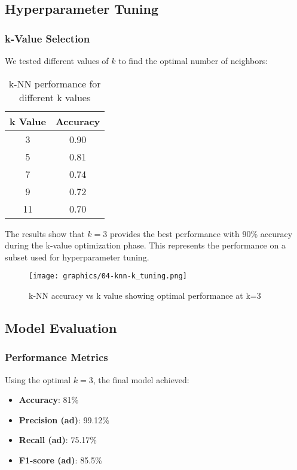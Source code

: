\subsection{Hyperparameter Tuning}
\subsubsection{k-Value Selection}
We tested different values of $k$ to find the optimal number of neighbors:

\begin{table}[H]
\centering
\caption{k-NN performance for different k values}
\label{tab:knn-k-values}
\begin{tabular}{cc}
\toprule
\textbf{k Value} & \textbf{Accuracy} \\
\midrule
3 & 0.90 \\
5 & 0.81 \\
7 & 0.74 \\
9 & 0.72 \\
11 & 0.70 \\
\bottomrule
\end{tabular}
\end{table}

The results show that $k = 3$ provides the best performance with 90\% accuracy during the k-value optimization phase. This represents the performance on a subset used for hyperparameter tuning.

\begin{figure}[H]
\centering
\texttt{[image: graphics/04-knn-k\_tuning.png]}
\caption{k-NN accuracy vs k value showing optimal performance at k=3}
\label{fig:knn-k-tuning}
\end{figure}

\subsection{Model Evaluation}
\subsubsection{Performance Metrics}
Using the optimal $k = 3$, the final model achieved:

\begin{itemize}
    \item \textbf{Accuracy}: 81\%
    \item \textbf{Precision (ad)}: 99.12\%
    \item \textbf{Recall (ad)}: 75.17\%
    \item \textbf{F1-score (ad)}: 85.5\%
\end{itemize}

